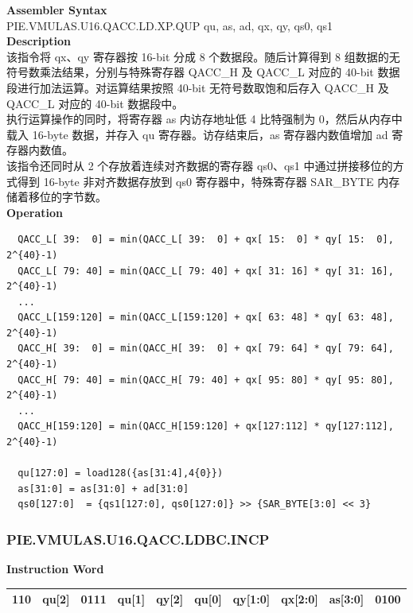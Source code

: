\textbf{Assembler Syntax} \\
PIE.VMULAS.U16.QACC.LD.XP.QUP qu, as, ad, qx, qy, qs0, qs1 \\
\textbf{Description} \\
该指令将 qx、qy 寄存器按 16-bit 分成 8 个数据段。随后计算得到 8 组数据的无符号数乘法结果，分别与特殊寄存器 QACC\_H 及 QACC\_L 对应的 40-bit 数据段进行加法运算。对运算结果按照 40-bit 无符号数取饱和后存入 QACC\_H 及 QACC\_L 对应的 40-bit 数据段中。\\
执行运算操作的同时，将寄存器 as 内访存地址低 4 比特强制为 0，然后从内存中载入 16-byte 数据，并存入 qu 寄存器。访存结束后，as 寄存器内数值增加 ad 寄存器内数值。\\
该指令还同时从 2 个存放着连续对齐数据的寄存器 qs0、qs1 中通过拼接移位的方式得到 16-byte 非对齐数据存放到 qs0 寄存器中，特殊寄存器 SAR\_BYTE 内存储着移位的字节数。\\
\textbf{Operation}
\begin{lstlisting}
  QACC_L[ 39:  0] = min(QACC_L[ 39:  0] + qx[ 15:  0] * qy[ 15:  0], 2^{40}-1)
  QACC_L[ 79: 40] = min(QACC_L[ 79: 40] + qx[ 31: 16] * qy[ 31: 16], 2^{40}-1)
  ...
  QACC_L[159:120] = min(QACC_L[159:120] + qx[ 63: 48] * qy[ 63: 48], 2^{40}-1)
  QACC_H[ 39:  0] = min(QACC_H[ 39:  0] + qx[ 79: 64] * qy[ 79: 64], 2^{40}-1)
  QACC_H[ 79: 40] = min(QACC_H[ 79: 40] + qx[ 95: 80] * qy[ 95: 80], 2^{40}-1)
  ...
  QACC_H[159:120] = min(QACC_H[159:120] + qx[127:112] * qy[127:112], 2^{40}-1)

  qu[127:0] = load128({as[31:4],4{0}})
  as[31:0] = as[31:0] + ad[31:0]
  qs0[127:0]  = {qs1[127:0], qs0[127:0]} >> {SAR_BYTE[3:0] << 3}
\end{lstlisting}

\newpage
\subsubsection{PIE.VMULAS.U16.QACC.LDBC.INCP}\label{instruction:PIEVMULASU16QACCLDBCINCP}
\setlength\tabcolsep{6pt}
\textbf{Instruction Word} \\
\begin{tabular}{|c|c|c|c|c|c|c|c|c|c|}
	\hline
	110 & qu[2] & 0111 & qu[1] & qy[2] & qu[0] & qy[1:0] & qx[2:0] & as[3:0] & 0100 \\
	\hline
\end{tabular}

